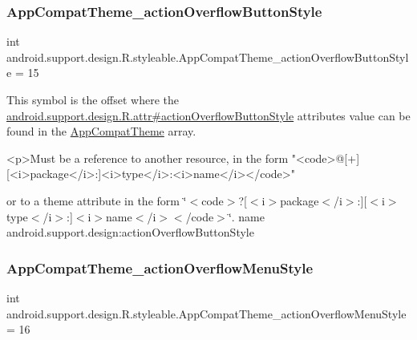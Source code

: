 \subsubsection{\texorpdfstring{App\+Compat\+Theme\+\_\+action\+Overflow\+Button\+Style}{AppCompatTheme\_actionOverflowButtonStyle}}
{\footnotesize\ttfamily int android.\+support.\+design.\+R.\+styleable.\+App\+Compat\+Theme\+\_\+action\+Overflow\+Button\+Style = 15\hspace{0.3cm}{\ttfamily [static]}}

This symbol is the offset where the \hyperlink{classandroid_1_1support_1_1design_1_1R_1_1attr_a3334a1bfcd970506bfaebf25b97ddb7c}{android.\+support.\+design.\+R.\+attr\#action\+Overflow\+Button\+Style} attribute\textquotesingle{}s value can be found in the \hyperlink{classandroid_1_1support_1_1design_1_1R_1_1styleable_afb351dc8de20cbd4c89abe360373010c}{App\+Compat\+Theme} array.

\begin{DoxyVerb}      <p>Must be a reference to another resource, in the form "<code>@[+][<i>package</i>:]<i>type</i>:<i>name</i></code>"
\end{DoxyVerb}
 or to a theme attribute in the form \char`\"{}$<$code$>$?\mbox{[}$<$i$>$package$<$/i$>$\+:\mbox{]}\mbox{[}$<$i$>$type$<$/i$>$\+:\mbox{]}$<$i$>$name$<$/i$>$$<$/code$>$\char`\"{}.  name android.\+support.\+design\+:action\+Overflow\+Button\+Style \mbox{\label{classandroid_1_1support_1_1design_1_1R_1_1styleable_a9665b225f5841e21d3041cc0b4bc2c20}} 
\subsubsection{\texorpdfstring{App\+Compat\+Theme\+\_\+action\+Overflow\+Menu\+Style}{AppCompatTheme\_actionOverflowMenuStyle}}
{\footnotesize\ttfamily int android.\+support.\+design.\+R.\+styleable.\+App\+Compat\+Theme\+\_\+action\+Overflow\+Menu\+Style = 16\hspace{0.3cm}{\ttfamily [static]}}

